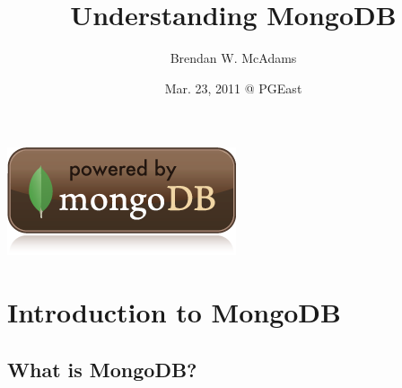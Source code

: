 \documentclass[xcolor=dvipsnames]{beamer}
\title{Understanding MongoDB} %
\institute[10gen, Inc.]{10gen, Inc.}
\author[B.W. McAdams]{Brendan W. McAdams}
\date{Mar. 23, 2011 @ PGEast}
\begin{document}
\begin{frame}
  \titlepage
  \begin{center}
  \includegraphics[scale=0.25]{images/powered_mongo.png}
  \end{center}
\end{frame}
\section{Introduction to MongoDB}

\subsection{What is MongoDB?}
\end{document}
